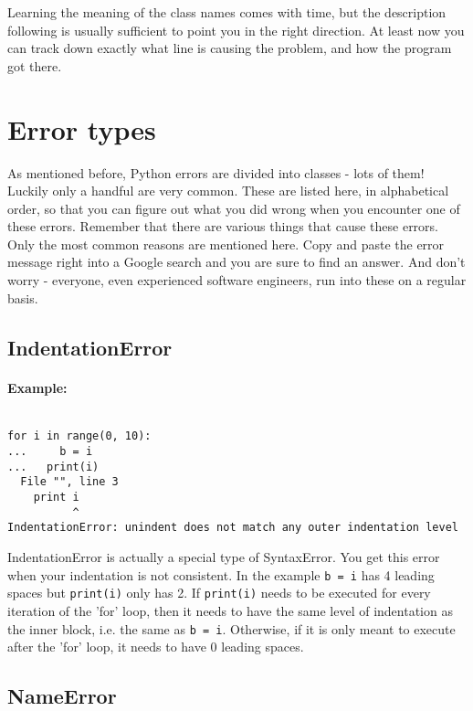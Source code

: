 Learning the meaning of the class names comes with time, but the   description following is usually sufficient to point you in the right   direction. At least now you can track down exactly what line is causing   the problem, and how the program got there.

\section{Error types}

As mentioned before, Python errors are divided into classes - lots of them!                 Luckily only a handful are very common. These are listed here, in alphabetical order,                 so that you can figure out what you did wrong when you encounter one of these errors. Remember that                 there are various things that cause these errors. Only the most common reasons are mentioned here. Copy and paste the error message                 right into a Google search and you are sure to find an answer. And don't worry -                  everyone, even experienced software engineers, run into these on a regular basis.

\subsection{IndentationError}

\paragraph{Example:}
\begin{lstlisting}

for i in range(0, 10):
...     b = i
...   print(i)
  File "", line 3
    print i
          ^
IndentationError: unindent does not match any outer indentation level\end{lstlisting}

IndentationError is actually a special type of SyntaxError. You get this error when your indentation is not consistent. In the                  example 
\texttt{b = i} has 4 leading spaces but 
\texttt{print(i)} only has 2. If 
\texttt{print(i)} needs to be executed                 for every iteration of the 'for' loop, then it needs to have the same level of indentation as the inner block, i.e. the same as 
\texttt{b = i}.                 Otherwise, if it is only meant to execute after the 'for' loop, it needs to have 0 leading spaces.

\subsection{NameError}

